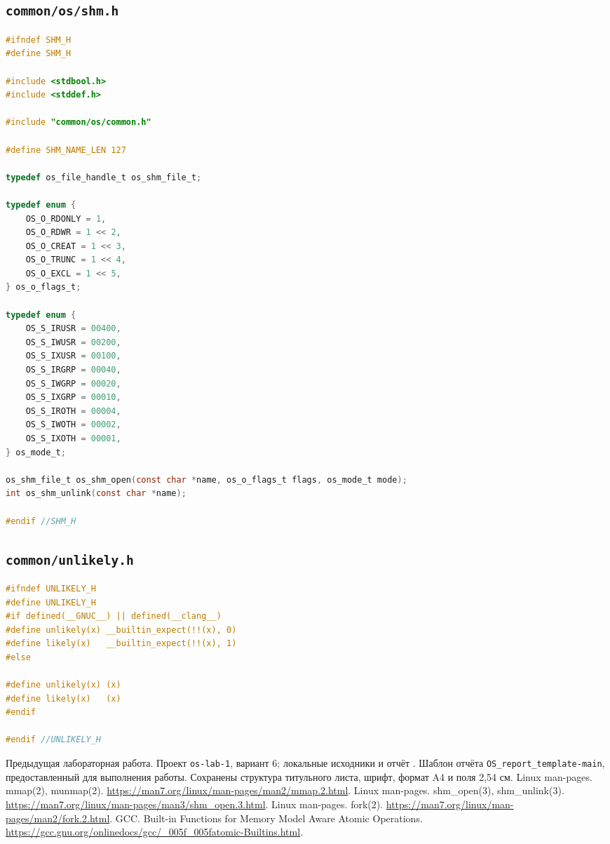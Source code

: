 \documentclass[12pt,a4paper,oneside,fleqn]{article}
\begin{document}
\subsection*{\texttt{common/os/shm.h}}
\begin{lstlisting}[language=C]
#ifndef SHM_H
#define SHM_H

#include <stdbool.h>
#include <stddef.h>

#include "common/os/common.h"

#define SHM_NAME_LEN 127

typedef os_file_handle_t os_shm_file_t;

typedef enum {
    OS_O_RDONLY = 1,
    OS_O_RDWR = 1 << 2,
    OS_O_CREAT = 1 << 3,
    OS_O_TRUNC = 1 << 4,
    OS_O_EXCL = 1 << 5,
} os_o_flags_t;

typedef enum {
    OS_S_IRUSR = 00400,
    OS_S_IWUSR = 00200,
    OS_S_IXUSR = 00100,
    OS_S_IRGRP = 00040,
    OS_S_IWGRP = 00020,
    OS_S_IXGRP = 00010,
    OS_S_IROTH = 00004,
    OS_S_IWOTH = 00002,
    OS_S_IXOTH = 00001,
} os_mode_t;

os_shm_file_t os_shm_open(const char *name, os_o_flags_t flags, os_mode_t mode);
int os_shm_unlink(const char *name);

#endif //SHM_H
\end{lstlisting}
\subsection*{\texttt{common/unlikely.h}}
\begin{lstlisting}[language=C]
#ifndef UNLIKELY_H
#define UNLIKELY_H
#if defined(__GNUC__) || defined(__clang__)
#define unlikely(x)	__builtin_expect(!!(x), 0)
#define likely(x)	__builtin_expect(!!(x), 1)
#else

#define unlikely(x) (x)
#define likely(x)	(x)
#endif

#endif //UNLIKELY_H
\end{lstlisting}
\clearpage
\begin{thebibliography}{9}
 Предыдущая лабораторная работа. Проект \texttt{os-lab-1},
вариант 6; локальные исходники и отчёт .
 Шаблон отчёта \texttt{OS\_report\_template-main},
предоставленный для выполнения работы. Сохранены структура титульного листа,
шрифт, формат A4 и поля 2,54 см.
 Linux man-pages. mmap(2), munmap(2).
\url{https://man7.org/linux/man-pages/man2/mmap.2.html}.
 Linux man-pages. shm\_open(3), shm\_unlink(3).
\url{https://man7.org/linux/man-pages/man3/shm_open.3.html}.
 Linux man-pages. fork(2).
\url{https://man7.org/linux/man-pages/man2/fork.2.html}.
 GCC. Built-in Functions for Memory Model Aware Atomic Operations.
\url{https://gcc.gnu.org/onlinedocs/gcc/_005f_005fatomic-Builtins.html}.
\end{thebibliography}
\end{document}
